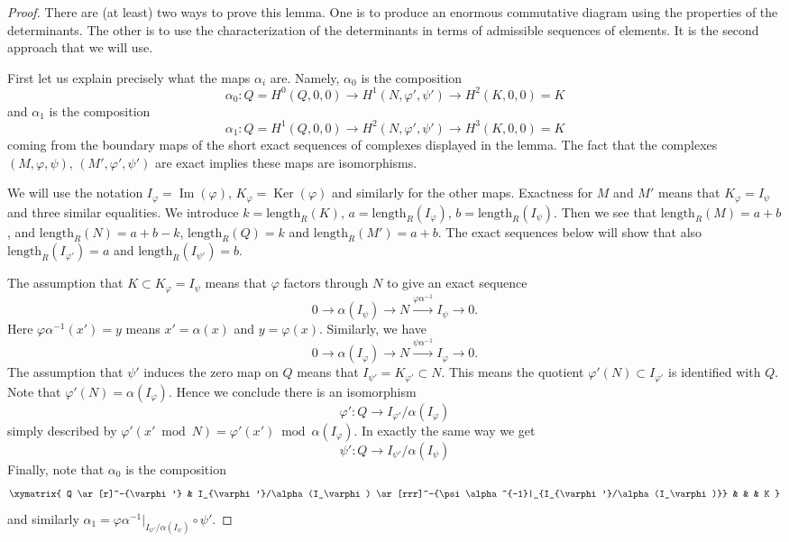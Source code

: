 \documentclass[10pt,a4paper]{amsart}
\theoremstyle{plain}
\theoremstyle{definition}
\theoremstyle{remark}
\numberwithin{equation}{subsection}
\def\Ker{\mathop{\mathrm{Ker}}}
\def\Im{\mathop{\mathrm{Im}}}
\begin{document}
\begin{proof}
There are (at least) two ways to prove this lemma. One is to produce an
enormous commutative diagram using the properties of the determinants.
The other is to use the characterization of the determinants in terms
of admissible sequences of elements. It is the second approach that we
will use.

\medskip\noindent
First let us explain precisely what the maps $\alpha_i$ are.
Namely, $\alpha_0$ is the composition
$$
\alpha_0 : Q = H^0(Q, 0, 0) \to H^1(N, \varphi', \psi') \to H^2(K, 0, 0) = K
$$
and $\alpha_1$ is the composition
$$
\alpha_1 : Q = H^1(Q, 0, 0) \to H^2(N, \varphi', \psi') \to H^3(K, 0, 0) = K
$$
coming from the boundary maps of the short exact sequences of complexes
displayed in the lemma. The fact that the
complexes $(M, \varphi, \psi)$, $(M', \varphi', \psi')$ are exact
implies these maps are isomorphisms.

\medskip\noindent
We will use the notation $I_\varphi = \Im(\varphi)$,
$K_\varphi = \Ker(\varphi)$ and similarly for the other maps.
Exactness for $M$ and $M'$
means that $K_\varphi = I_\psi$ and three similar equalities.
We introduce $k = \text{length}_R(K)$, $a = \text{length}_R(I_\varphi)$,
$b = \text{length}_R(I_\psi)$. Then we see that $\text{length}_R(M) = a + b$,
and $\text{length}_R(N) = a + b - k$, $\text{length}_R(Q) = k$
and $\text{length}_R(M') = a + b$. The exact sequences below will show
that also $\text{length}_R(I_{\varphi'}) = a$ and
$\text{length}_R(I_{\psi'}) = b$.

\medskip\noindent
The assumption that $K \subset K_\varphi = I_\psi$ means that
$\varphi$ factors through $N$ to give an exact sequence
$$
0 \to \alpha(I_\psi) \to N \xrightarrow{\varphi\alpha^{-1}} I_\psi \to 0.
$$
Here $\varphi\alpha^{-1}(x') = y$ means $x' = \alpha(x)$ and $y = \varphi(x)$.
Similarly, we have
$$
0 \to \alpha(I_\varphi) \to N \xrightarrow{\psi\alpha^{-1}} I_\varphi \to 0.
$$
The assumption that $\psi'$ induces the zero map on
$Q$ means that $I_{\psi'} = K_{\varphi'} \subset N$.
This means the quotient $\varphi'(N) \subset I_{\varphi'}$
is identified with $Q$. Note that $\varphi'(N) = \alpha(I_\varphi)$.
Hence we conclude there is an isomorphism
$$
\varphi' : Q \to I_{\varphi'}/\alpha(I_\varphi)
$$
simply described by
$\varphi'(x' \bmod N) = \varphi'(x') \bmod \alpha(I_\varphi)$.
In exactly the same way we get
$$
\psi' : Q \to I_{\psi'}/\alpha(I_\psi)
$$
Finally, note that $\alpha_0$ is the composition
$$
\xymatrix{
Q \ar[r]^-{\varphi'} &
I_{\varphi'}/\alpha(I_\varphi)
\ar[rrr]^-{\psi\alpha^{-1}|_{I_{\varphi'}/\alpha(I_\varphi)}} & & &
K
}
$$
and similarly
$\alpha_1 = \varphi\alpha^{-1}|_{I_{\psi'}/\alpha(I_\psi)} \circ \psi'$.


\end{proof}
\end{document}
